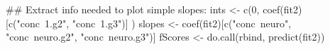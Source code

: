 \begin{Schunk}
\begin{Sinput}
 ## Extract info needed to plot simple slopes:
 ints <- c(0,
           coef(fit2)[c("conc~1.g2",
                        "conc~1.g3")]
           )
 slopes <- coef(fit2)[c("conc~neuro",
                        "conc~neuro.g2",
                        "conc~neuro.g3")]
 fScores <- do.call(rbind, predict(fit2))
\end{Sinput}
\end{Schunk}
